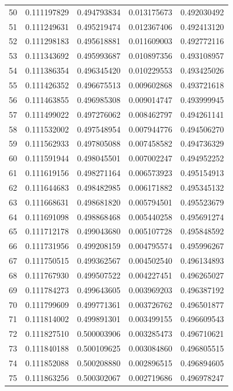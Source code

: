 \begin{tabular}{rcccc}
50 & 0.111197829 & 0.494793834 & 0.013175673 & 0.492030492 \\
51 & 0.111249631 & 0.495219474 & 0.012367406 & 0.492413120 \\
52 & 0.111298183 & 0.495618881 & 0.011609003 & 0.492772116 \\
53 & 0.111343692 & 0.495993687 & 0.010897356 & 0.493108957 \\
54 & 0.111386354 & 0.496345420 & 0.010229553 & 0.493425026 \\
55 & 0.111426352 & 0.496675513 & 0.009602868 & 0.493721618 \\
56 & 0.111463855 & 0.496985308 & 0.009014747 & 0.493999945 \\
57 & 0.111499022 & 0.497276062 & 0.008462797 & 0.494261141 \\
58 & 0.111532002 & 0.497548954 & 0.007944776 & 0.494506270 \\
59 & 0.111562933 & 0.497805088 & 0.007458582 & 0.494736329 \\
60 & 0.111591944 & 0.498045501 & 0.007002247 & 0.494952252 \\
61 & 0.111619156 & 0.498271164 & 0.006573923 & 0.495154913 \\
62 & 0.111644683 & 0.498482985 & 0.006171882 & 0.495345132 \\
63 & 0.111668631 & 0.498681820 & 0.005794501 & 0.495523679 \\
64 & 0.111691098 & 0.498868468 & 0.005440258 & 0.495691274 \\
65 & 0.111712178 & 0.499043680 & 0.005107728 & 0.495848592 \\
66 & 0.111731956 & 0.499208159 & 0.004795574 & 0.495996267 \\
67 & 0.111750515 & 0.499362567 & 0.004502540 & 0.496134893 \\
68 & 0.111767930 & 0.499507522 & 0.004227451 & 0.496265027 \\
69 & 0.111784273 & 0.499643605 & 0.003969203 & 0.496387192 \\
70 & 0.111799609 & 0.499771361 & 0.003726762 & 0.496501877 \\
71 & 0.111814002 & 0.499891301 & 0.003499155 & 0.496609543 \\
72 & 0.111827510 & 0.500003906 & 0.003285473 & 0.496710621 \\
73 & 0.111840188 & 0.500109625 & 0.003084860 & 0.496805515 \\
74 & 0.111852088 & 0.500208880 & 0.002896515 & 0.496894605 \\
75 & 0.111863256 & 0.500302067 & 0.002719686 & 0.496978247 \\

\end{tabular}
